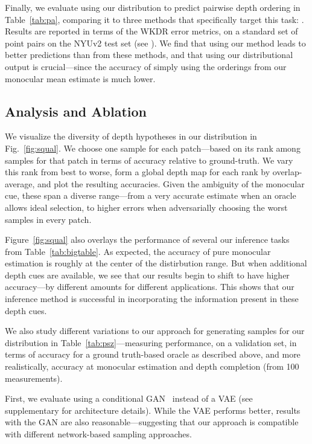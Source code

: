 \documentclass[10pt,twocolumn,letterpaper]{article}
\begin{document}
Finally, we evaluate using our distribution to predict pairwise depth ordering in Table~\ref{tab:pa}, comparing it to three methods that specifically target this task: \cite{chen2016single,zoran2015learning,xian2018monocular}. Results are reported in terms of the WKDR error metrics, on a standard set of point pairs on the NYUv2 test set (see \cite{zoran2015learning}). We find that using our method leads to better predictions than from these methods, and that using our distributional output is crucial---since the accuracy of simply using the orderings from our monocular mean estimate is much lower.

\subsection{Analysis and Ablation}

We visualize the diversity of depth hypotheses in our distribution in Fig.~\ref{fig:squal}. We choose one sample for each patch---based on its rank among samples for that patch in terms of accuracy relative to ground-truth. We vary this rank from best to worse, form a global depth map for each rank by overlap-average, and plot the resulting accuracies. Given the ambiguity of the monocular cue, these span a diverse range---from a very accurate estimate when an oracle allows ideal selection, to higher errors when adversarially choosing the worst samples in every patch.

Figure~\ref{fig:squal} also overlays the performance of several our inference tasks from Table~\ref{tab:bigtable}. As expected, the accuracy of pure monocular estimation is roughly at the center of the distirbution range. But when additional depth cues are available, we see that our results begin to shift to have higher accuracy---by different amounts for different applications. This shows that our inference method is successful in incorporating the information present in these depth cues.

We also study different variations to our approach for generating samples for our distribution  in Table~\ref{tab:psz}---measuring  performance, on a validation set, in terms of accuracy for a ground truth-based oracle as described above, and more realistically, accuracy at monocular estimation and depth completion (from 100 measurements).

First, we evaluate using a conditional GAN~\cite{mirza2014conditional} instead of a VAE (see supplementary for architecture details). While the VAE performs better, results with the GAN are also reasonable---suggesting that our approach is compatible with different network-based sampling approaches.
\end{document}
